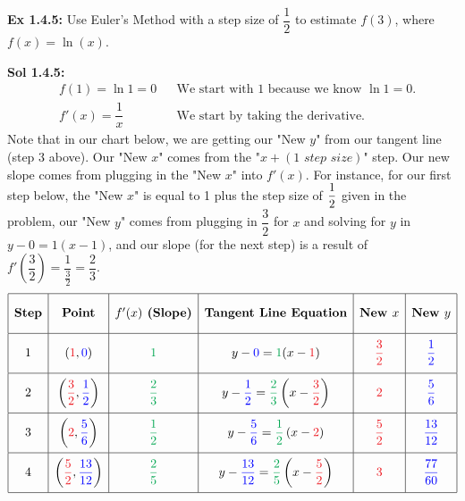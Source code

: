 \begin{tcolorbox}[example]
    \textbf{Ex 1.4.5: } Use Euler's Method with a step size of $\dfrac{1}{2}$ to estimate $f(3)$, where $f(x) = \ln (x)$.
\end{tcolorbox}
\begin{tcolorbox}[solution]
    \textbf{Sol 1.4.5: } \begin{align*}
        & f(1) = \ln 1 = 0 && \text{We start with 1 because we know } \ln 1 = 0. \\[11pt]
        & f'(x) = \dfrac{1}{x} && \text{We start by taking the derivative.}
    \end{align*}
    Note that in our chart below, we are getting our "New $y$" from our tangent line (step 3 above). Our "New $x$" comes from the "$x + (\textit{1 step size})$" step. Our new slope comes from plugging in the "New $x$" into $f'(x)$. For instance, for our first step below, the "New $x$" is equal to 1 plus the step size of $\dfrac{1}{2} \smallforcespace$ given in the problem, our "New $y$" comes from plugging in $\dfrac{3}{2}$ for $x$ and solving for $y$ in $y - 0 = 1(x - 1)$, and our slope (for the next step) is a result of $f'\left(\dfrac{3}{2}\right) = \dfrac{1}{\frac{3}{2}} = \dfrac{2}{3}$. \\
    \begin{align*} 
        \def\arraystretch{2.2} 
        \begin{array}{|c|c|c|c|c|c|}
            \hline 
            \textbf{Step} & \textbf{Point} & f'(x) \textbf{ (Slope)} & \textbf{Tangent Line Equation} & \textbf{New } x & \textbf{New } y \\[5.5pt] \hline
            1 & (\textcolor{Red}{1}, \textcolor{blue}{0}) & \textcolor{Green}{1} & y - \textcolor{blue}{0} = \textcolor{Green}{1}(x - \textcolor{Red}{1}) & \textcolor{Red}{\dfrac{3}{2}} & \textcolor{blue}{\dfrac{1}{2}} \\[5.5pt] \hline
            2 & \left(\textcolor{Red}{\dfrac{3}{2}}, \textcolor{blue}{\dfrac{1}{2}}\right) & \textcolor{Green}{\dfrac{2}{3}} & y - \textcolor{blue}{\dfrac{1}{2}} = \textcolor{Green}{\dfrac{2}{3}}\left(x - \textcolor{Red}{\dfrac{3}{2}}\right) & \textcolor{Red}{2} & \textcolor{blue}{\dfrac{5}{6}} \\[5.5pt] \hline
            3 & \left(\textcolor{Red}{2}, \textcolor{blue}{\dfrac{5}{6}}\right) & \textcolor{Green}{\dfrac{1}{2}} & y - \textcolor{blue}{\dfrac{5}{6}} = \textcolor{Green}{\dfrac{1}{2}}\left(x - \textcolor{Red}{2}\right) & \textcolor{Red}{\dfrac{5}{2}} & \textcolor{blue}{\dfrac{13}{12}} \\[5.5pt] \hline
            4 & \left(\textcolor{Red}{\dfrac{5}{2}}, \textcolor{blue}{\dfrac{13}{12}}\right) & \textcolor{Green}{\dfrac{2}{5}} & y - \textcolor{blue}{\dfrac{13}{12}} = \textcolor{Green}{\dfrac{2}{5}}\left(x - \textcolor{Red}{\dfrac{5}{2}}\right) & \textcolor{Red}{3} & \textcolor{blue}{\dfrac{77}{60}} \\[5.5pt]
            \hline
        \end{array}
    \end{align*}


\end{tcolorbox}
